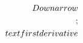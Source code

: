 \documentclass[preview]{standalone}
\begin{document}
\begin{align*}
\special{dvisvgm:raw <g id='unique000'>}\\Downarrow\\;\\text{first derivative}\special{dvisvgm:raw </g>}
\end{align*}
\end{document}
